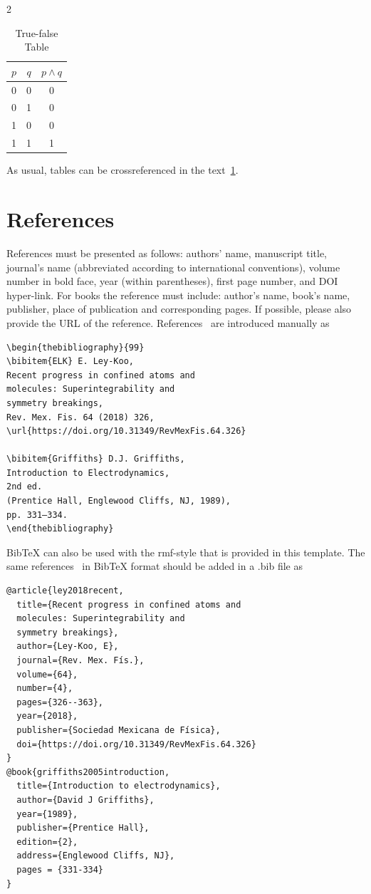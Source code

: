 \documentclass{rmf-d}
\begin{document}
\begin{multicols}{2}
\begin{table}[H]
 \centering
 \caption{True-false Table}
 
 \begin{tabular}{cc|c}
  $p$&$q$&$p\land q$\\
  \hline
  0&0&0\\
  0&1&0\\
  1&0&0\\
  1&1&1
 \end{tabular}\label{table1}
\end{table}
As usual, tables can be crossreferenced in the text~\ref{table1}.

\section{References}

References must be presented as follows: authors’ name, manuscript title, journal’s name (abbreviated according to international conventions), volume number in bold face, year (within parentheses), first page number, and DOI hyper-link. For books the reference must include: author's name, book's name, publisher, place of publication and corresponding pages. If possible, please also provide the URL of the reference.
 References~\cite{ley2018recent,griffiths2005introduction} are introduced manually as
\begin{verbatim}
\begin{thebibliography}{99}
\bibitem{ELK} E. Ley-Koo, 
Recent progress in confined atoms and 
molecules: Superintegrability and 
symmetry breakings, 
Rev. Mex. Fis. 64 (2018) 326,
\url{https://doi.org/10.31349/RevMexFis.64.326}

\bibitem{Griffiths} D.J. Griffiths, 
Introduction to Electrodynamics, 
2nd ed. 
(Prentice Hall, Englewood Cliffs, NJ, 1989), 
pp. 331–334.
\end{thebibliography}
\end{verbatim}



BibTeX can also be used with the {\rm rmf-style} that is provided in this template. The same references~\cite{ley2018recent,griffiths2005introduction} in BibTeX format should be added in a .bib file as
{\footnotesize
\begin{verbatim}
@article{ley2018recent,
  title={Recent progress in confined atoms and 
  molecules: Superintegrability and 
  symmetry breakings},
  author={Ley-Koo, E},
  journal={Rev. Mex. Fís.},
  volume={64},
  number={4},
  pages={326--363},
  year={2018},
  publisher={Sociedad Mexicana de Física},
  doi={https://doi.org/10.31349/RevMexFis.64.326}
}
@book{griffiths2005introduction,
  title={Introduction to electrodynamics},
  author={David J Griffiths},
  year={1989},
  publisher={Prentice Hall},
  edition={2},
  address={Englewood Cliffs, NJ},
  pages = {331-334}
}
\end{verbatim}
}


\end{multicols}
\end{document}
